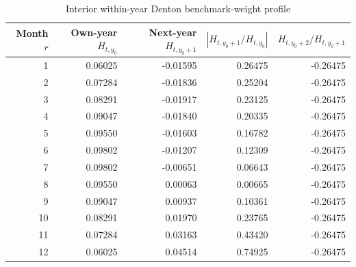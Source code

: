 \begin{table}[htbp]
\centering\scriptsize
\caption{Interior within-year Denton benchmark-weight profile}
\label{tab:s_denton_profile}
\begin{tabular}{rrrrr}
\toprule
Month $r$ & Own-year $H_{t,y_0}$ & Next-year $H_{t,y_0+1}$ & $|H_{t,y_0+1}/H_{t,y_0}|$ & $H_{t,y_0+2}/H_{t,y_0+1}$ \\
\midrule
1  & 0.06025 & -0.01595 & 0.26475 & -0.26475 \\
2  & 0.07284 & -0.01836 & 0.25204 & -0.26475 \\
3  & 0.08291 & -0.01917 & 0.23125 & -0.26475 \\
4  & 0.09047 & -0.01840 & 0.20335 & -0.26475 \\
5  & 0.09550 & -0.01603 & 0.16782 & -0.26475 \\
6  & 0.09802 & -0.01207 & 0.12309 & -0.26475 \\
7  & 0.09802 & -0.00651 & 0.06643 & -0.26475 \\
8  & 0.09550 &  0.00063 & 0.00665 & -0.26475 \\
9  & 0.09047 &  0.00937 & 0.10361 & -0.26475 \\
10 & 0.08291 &  0.01970 & 0.23765 & -0.26475 \\
11 & 0.07284 &  0.03163 & 0.43420 & -0.26475 \\
12 & 0.06025 &  0.04514 & 0.74925 & -0.26475 \\
\bottomrule
\end{tabular}
\end{table}
